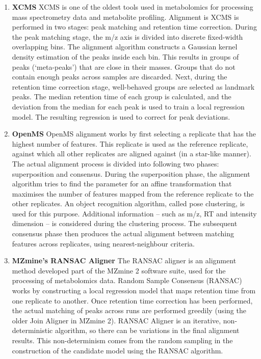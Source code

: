 \begin{enumerate}
\item \textbf{XCMS} \cite{Smith2006} XCMS is one of the oldest tools used in metabolomics for processing mass spectrometry data and metabolite profiling. Alignment is XCMS is performed in two stages: peak matching and retention time correction. During the peak matching stage, the m/z axis is divided into discrete fixed-width overlapping bins. The alignment algorithm constructs a Gaussian kernel density estimation of the peaks inside each bin. This results in groups of peaks (`meta-peaks') that are close in their masses. Groups that do not contain enough peaks across samples are discarded. Next, during the retention time correction stage, well-behaved groups are selected as landmark peaks. The median retention time of each group is calculated, and the deviation from the median for each peak is used to train a local regression model. The resulting regression is used to correct for peak deviations.
\item \textbf{OpenMS} \cite{Lange2007} OpenMS alignment works by first selecting a replicate that has the highest number of features. This replicate is used as the reference replicate, against which all other replicates are aligned against (in a star-like manner). The actual alignment process is divided into following two phases: superposition and consensus. During the superposition phase, the alignment algorithm tries to find the parameter for an affine transformation that maximises the number of features mapped from the reference replicate to the other replicates. An object recognition algorithm, called pose clustering, is used for this purpose. Additional information -- such as m/z, RT and intensity dimension -- is considered during the clustering process. The subsequent consensus phase then produces the actual alignment between matching features across replicates, using nearest-neighbour criteria. %
\item \textbf{MZmine's RANSAC Aligner} \cite{Pluskal2010} The RANSAC aligner is an alignment method developed part of the MZmine 2 software suite, used for the processing of metabolomics data. Random Sample Consensus (RANSAC) works by constructing a local regression model that maps retention time from one replicate to another. Once retention time correction has been performed, the actual matching of peaks across runs are performed greedily (using the older Join Aligner in MZmine 2). RANSAC Aligner is an iterative, non-deterministic algorithm, so there can be variations in the final alignment results. This non-determinism comes from the random sampling in the construction of the candidate model using the RANSAC algorithm\cite{Fischler1981}. 
\end{enumerate}

